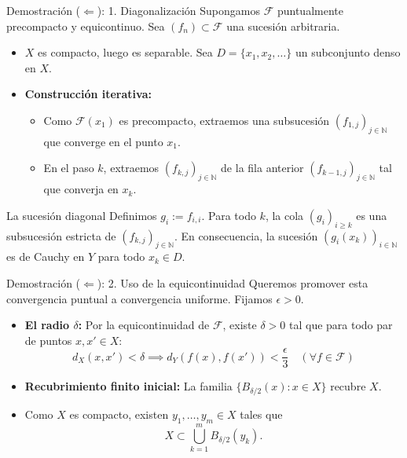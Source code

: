 \begin{frame}{Demostración ($\Leftarrow$): 1. Diagonalización}
    Supongamos $\mathcal F$ puntualmente precompacto y equicontinuo. Sea $(f_n)\subset \mathcal F$ una sucesión arbitraria.
    \begin{itemize}
        \item $X$ es compacto, luego es separable. Sea $D = \{x_1, x_2, \dots \}$ un subconjunto denso en $X$.
        \item \textbf{Construcción iterativa:}
        \begin{itemize}
            \item Como $\mathcal{F}(x_1)$ es precompacto, extraemos una subsucesión $(f_{1,j})_{j\in\mathbb{N}}$ que converge en el punto $x_1$.
            \item En el paso $k$, extraemos $(f_{k,j})_{j\in\mathbb{N}}$ de la fila anterior $(f_{k-1,j})_{j\in\mathbb{N}}$ tal que converja en $x_k$.
        \end{itemize}
    \end{itemize}
    \begin{block}{La sucesión diagonal}
        Definimos $g_i := f_{i,i}$. Para todo $k$, la cola $(g_i)_{i \ge k}$ es una subsucesión estricta de $(f_{k,j})_{j\in\mathbb{N}}$. En consecuencia, la sucesión $(g_i(x_k))_{i\in\mathbb{N}}$ es de Cauchy en $Y$ para todo $x_k \in D$.
    \end{block}
\end{frame}

\begin{frame}{Demostración ($\Leftarrow$): 2. Uso de la equicontinuidad}
    Queremos promover esta convergencia puntual a convergencia uniforme. Fijamos $\epsilon > 0$.
    \begin{itemize}
        \item \textbf{El radio $\delta$:} Por la equicontinuidad de $\mathcal F$, existe $\delta > 0$ tal que para todo par de puntos $x, x' \in X$:
        \[ d_X(x, x') < \delta \implies d_Y(f(x), f(x')) < \frac{\epsilon}{3} \quad (\forall f \in \mathcal{F}) \]
        \item \textbf{Recubrimiento finito inicial:} La familia $\{B_{\delta/2}(x):x\in X\}$ recubre $X$.
        \item Como $X$ es compacto, existen $y_1,\dots,y_m\in X$ tales que
        \[ X\subset \bigcup_{k=1}^{m} B_{\delta/2}(y_k). \]
    \end{itemize}
\end{frame}

